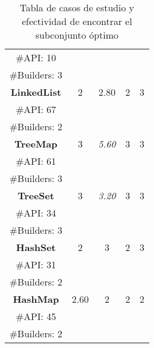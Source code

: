 \begin{table}[H]
\begin{tabular}{c ccccc}
\multicolumn{2}{c}{\tiny \#API: 10} &  &   & &    \\
\multicolumn{2}{c}{\tiny \#Builders: 3} &  &   & &    \\
\midrule\multicolumn{2}{c}{\textbf{LinkedList}} & 2 &  2.80 &  2 &  3   \\
\multicolumn{2}{c}{\tiny \#API: 67} &  &   & &   \\
\multicolumn{2}{c}{\tiny \#Builders: 2} &  &   & &    \\
\midrule
\multicolumn{2}{c}{\textbf{TreeMap}} &  3 & \cellcolor{gray!25}\emph{5.60}  &  3  &  3   \\
\multicolumn{2}{c}{\tiny \#API: 61} &  &   & &  \\
\multicolumn{2}{c}{\tiny \#Builders: 3} &  &   & &  \\
\midrule
\multicolumn{2}{c}{\textbf{TreeSet}} &  3&\cellcolor{gray!25} \emph{3.20}  &  3 &  3  \\
\multicolumn{2}{c}{\tiny \#API: 34} &  &   & &  \\
\multicolumn{2}{c}{\tiny \#Builders: 3} &  &   & &   \\
\midrule
\multicolumn{2}{c}{\textbf{HashSet}} &  2 &3  &  2 &  3 \\
\multicolumn{2}{c}{\tiny \#API: 31} &  &   & &  \\
\multicolumn{2}{c}{\tiny \#Builders: 2} &  &   & &    \\
\midrule
\multicolumn{2}{c}{\textbf{HashMap}} & 2.60  & 2  &2   &2     \\
\multicolumn{2}{c}{\tiny \#API: 45} &  &   & &    \\
\multicolumn{2}{c}{\tiny \#Builders: 2} &  &   & &   \\
\hline
\end{tabular}

\caption{Tabla de casos de estudio y efectividad de encontrar el subconjunto óptimo}
\label{tab:efectividad}
\end{table}

